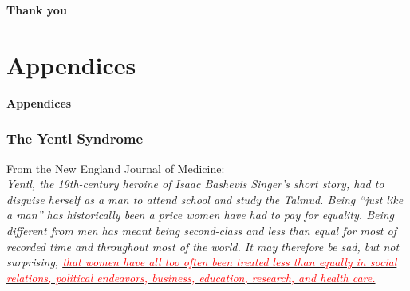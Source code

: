 \documentclass[10pt,letterpaper,subeqn]{beamer}
\begin{document}
\begin{frame}[plain]
\begin{center}
\textbf{Thank you}
\end{center}
\end{frame}


\setcounter{table}{0}
\renewcommand{\thetable}{A\arabic{table}}
\setcounter{figure}{0}
\renewcommand{\thefigure}{A\arabic{figure}}

\section{Appendices}

\begin{frame}[plain]
\begin{center}
\textbf{Appendices}
\end{center}
\end{frame}


\begin{frame}[label=Yentl]
\frametitle{The Yentl Syndrome}
From the New England Journal of Medicine: \\
\vspace{4mm}
\textit{Yentl, the 19th-century heroine of Isaac Bashevis Singer's short story, 
had to disguise herself as a man to attend school and study the Talmud. Being 
``just like a man'' has historically been a price women have had to pay for 
equality. Being different from men has meant being second-class and less than 
equal for most of recorded time and throughout most of the world. It may therefore 
be sad, but not surprising, \hyperlink{intro}{\textcolor{red}{that women have all 
too often been treated less than equally in social relations, political endeavors, 
business, education, research, and health care.}}}\\
\end{frame}
\end{document}
